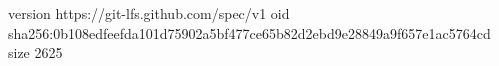 version https://git-lfs.github.com/spec/v1
oid sha256:0b108edfeefda101d75902a5bf477ce65b82d2ebd9e28849a9f657e1ac5764cd
size 2625
